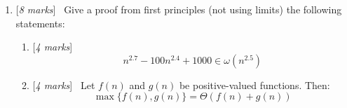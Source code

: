 \documentclass[11pt]{article}
\newcommand{\Q}[1]{\medskip\item {[{\em #1 marks\/}]}\ }
\newif\ifsol
\newcommand{\solution}[1]{{\ifsol \color{red} {#1} \fi}}
\begin{document}
\begin{enumerate}


\Q{8} Give a proof from first principles (not using limits) the following statements: 
\begin{enumerate}
\Q{4} 
$$n^{2.7} - 100n^{2.4} + 1000 \in \omega(n^{2.5})$$


\solution{
    We want to prove for all constant $c > 0$, there exists a $n_0$ such that 
    $\lvert n^{2.7} - 100n^{2.4} + 1000 \rvert > \lvert n^{2.5} \rvert$ for all $n > n_0$\\
    If $c > 1$\\
    Let $n_0 = 10^{10} c^{10}$ and $n \geq n_0$
    \begin{align*}
        \lvert n^{2.7} - 100n^{2.4} + 1000 \rvert &= n^{2.5} (n^{0.2} - \frac {100} {n^{0.1}} + \frac {1000} {n^{2.5}})\\
        &\geq n^{2.5} (10^2 c^2 - \frac {100} {n^{0.1}} + \frac {1000} {n^{2.5}})\\
        &\geq n^{2.5} (10^2 c^2 - \frac {100} {10c} + \frac {1000} {n^{2.5}})\\
        &= n^{2.5} (10^2 c^2 - \frac {10} {c} + \frac {1000} {n^{2.5}})\\
        &> n^{2.5} (10^2 c^2 - \frac {10} {c} + 1)
        \text{ since $\frac {1000} {n^{2.5}} \leq \frac {1000} {10^{25} c^{25}} = \frac 1 {10^{22} c^{25}} < 1$}\\
        &> c n^{2.5}\\
        &> 0
    \end{align*}
    If $0 < c \leq 1$
    Let $n_0 = 10^{10}$ and $n \geq n_0$
    \begin{align*}
        n^{2.7} - 100n^{2.4} + 1000 &= n^{2.5} (n^{0.2} - \frac {100} {n^{0.1}} + \frac {1000} {n^{2.5}})\\
        &\geq n^{2.5} (10^2 - \frac {100} {10} + \frac {1000} {n^{2.5}})\\
        &< n^{2.5} (100 - 10 + 1) \text{ since $\frac {1000} {n^{2.5}} \leq \frac 1 {10^{22}} < 1$}\\
        &= 91 n^{2.5}\\
        &> c\\
        &> 0
    \end{align*}
    Hence, $n^{2.7} - 100n^{2.4} + 1000 \in \omega(n^{2.5})$
}


\Q{4} Let $f(n)$ and $g(n)$ be positive-valued functions. Then: 
$$\max\{f(n), g(n)\}=\Theta(f(n) + g(n))$$


\end{enumerate}
\end{enumerate}
\end{document}
